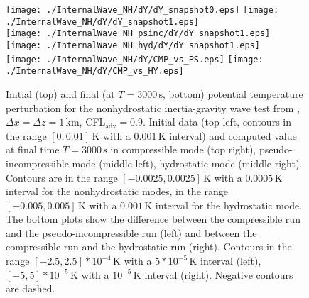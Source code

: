 \documentclass{ametsoc}
\theoremstyle{definition}
\begin{document}
\begin{figure}
\centering
 \texttt{[image: ./InternalWave\_NH/dY/dY\_snapshot0.eps]}
 \texttt{[image: ./InternalWave\_NH/dY/dY\_snapshot1.eps]}\\
 \texttt{[image: ./InternalWave\_NH\_psinc/dY/dY\_snapshot1.eps]}
 \texttt{[image: ./InternalWave\_NH\_hyd/dY/dY\_snapshot1.eps]}\\
  \texttt{[image: ./InternalWave\_NH/dY/CMP\_vs\_PS.eps]}
 \texttt{[image: ./InternalWave\_NH/dY/CMP\_vs\_HY.eps]}
 \caption{Initial (top) and final (at $T=3000\,\textrm{s}$, bottom) potential temperature perturbation for the nonhydrostatic inertia-gravity wave test from \cite{SkamarockKlemp1994}, $\Delta x=\Delta z=1\,\textrm{km}$, CFL$_\textrm{adv}=0.9$.  Initial data (top left, contours in the range $[0, 0.01]\,\textrm{K}$ with a $0.001\,\textrm{K}$ interval) and computed value at final time $T=3000\,\textrm{s}$ in compressible mode (top right), pseudo-incompressible mode (middle left), hydrostatic mode (middle right). Contours are in the range $[-0.0025, 0.0025]\,\textrm{K}$ with a $0.0005\,\textrm{K}$ interval for the nonhydrostatic modes, in the range $[-0.005, 0.005]\,\textrm{K}$ with a $0.001\,\textrm{K}$ interval for the hydrostatic mode. The bottom plots show the difference between the compressible run and the pseudo-incompressible run (left) and between the compressible run and the hydrostatic run (right). Contours in the range $[-2.5, 2.5]*10^{-4}\,\textrm{K}$ with a $5*10^{-5}\,\textrm{K}$ interval (left), $[-5, 5]*10^{-5}\,\textrm{K}$  with a $10^{-5}\,\textrm{K}$ interval (right). Negative contours are dashed.}
 \label{fig:SK94_NH}
\end{figure}
\end{document}
